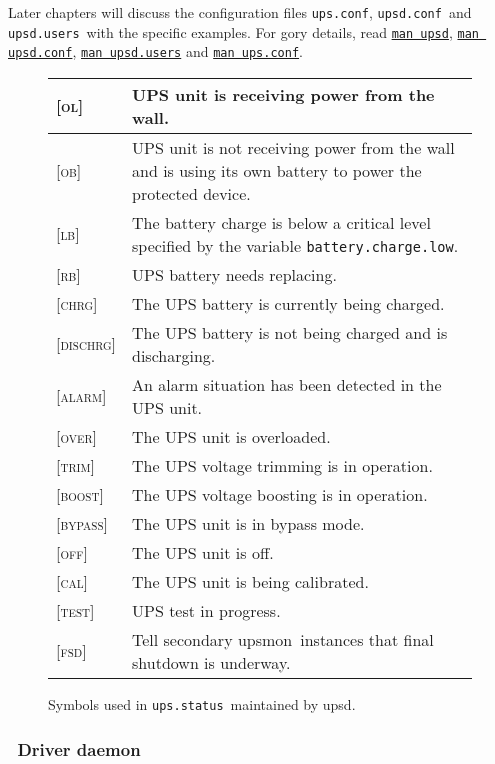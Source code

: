 \documentclass[12pt]{article}
\newlength{\headersep}\setlength{\headersep}{3mm}
\newcommand{\Hsep}{\hspace{\headersep}}
\newcommand{\newcolumn}{\vfill\eject}
\newcommand{\upsd}{\mbox{\textcolor{UPSDCOLOUR}{upsd}}}
\newcommand{\upsmon}{\mbox{\textcolor{MONCOLOUR}{upsmon}}}
\newcommand{\ALARM}{\textcolor{UPSDCOLOUR}{\textsc{alarm}}}
\newcommand{\BOOST}{\textcolor{UPSDCOLOUR}{\textsc{boost}}}
\newcommand{\BYPASS}{\textcolor{UPSDCOLOUR}{\textsc{bypass}}}
\newcommand{\CAL}{\textcolor{UPSDCOLOUR}{\textsc{cal}}}
\newcommand{\CHRG}{\textcolor{UPSDCOLOUR}{\textsc{chrg}}}
\newcommand{\DISCHRG}{\textcolor{UPSDCOLOUR}{\textsc{dischrg}}}
\newcommand{\FSDst}{\textcolor{UPSDCOLOUR}{\textsc{fsd}}}
\newcommand{\LB}{\textcolor{UPSDCOLOUR}{\textsc{lb}}}
\newcommand{\OB}{\textcolor{UPSDCOLOUR}{\textsc{ob}}}
\newcommand{\OFF}{\textcolor{UPSDCOLOUR}{\textsc{off}}}
\newcommand{\OL}{\textcolor{UPSDCOLOUR}{\textsc{ol}}}
\newcommand{\OVER}{\textcolor{UPSDCOLOUR}{\textsc{over}}}
\newcommand{\RB}{\textcolor{UPSDCOLOUR}{\textsc{rb}}}
\newcommand{\TEST}{\textcolor{UPSDCOLOUR}{\textsc{test}}}
\newcommand{\TRIM}{\textcolor{UPSDCOLOUR}{\textsc{trim}}}
\newcommand{\status}[1]{\textcolor{UPSDCOLOUR}{[{#1}]}}
\newcommand{\upsconf}{\textcolor{UPSDCOLOUR}{\texttt{ups.conf}}}
\newcommand{\upsdconf}{\textcolor{UPSDCOLOUR}{\texttt{upsd.conf}}}
\newcommand{\upsdusers}{\textcolor{UPSDCOLOUR}{\texttt{upsd.users}}}
\newcommand{\batterychargelow}{\textcolor{UPSDCOLOUR}{\texttt{battery{\allowbreak}.charge{\allowbreak}.low}}}
\newcommand{\upsstatus}{\textcolor{UPSDCOLOUR}{\texttt{ups{\allowbreak}.status}}}
\newcommand{\NUTman}[1]{\href{https://networkupstools.org/docs/man/#1.html}{\texttt{man #1}}}
\begin{document}
Later chapters will discuss the configuration files \upsconf, \upsdconf\ and
\upsdusers\ with the specific examples. For gory details, read \NUTman{upsd},
\NUTman{upsd.conf}, \NUTman{upsd.users} and \NUTman{ups.conf}.

\begin{figure}[htb]
\begin{center}
\begin{tabular}{|l|p{0.7\LinePrinterwidth}|}
\hline
\status{\OL}      & UPS unit is receiving power from the wall.  \\ \hline
\status{\OB}      & UPS unit is not receiving power from the wall and is using its
                    own battery to power the protected device. \\ \hline
\status{\LB}      & The battery charge is below a critical level specified by the 
                    variable \batterychargelow. \\ \hline
\status{\RB}      & UPS battery needs replacing.  \\ \hline
\status{\CHRG}    & The UPS battery is currently being charged. \\ \hline
\status{\DISCHRG} & The UPS battery is not being charged and is discharging.  \\ \hline
\status{\ALARM}   & An alarm situation has been detected in the UPS unit. \\ \hline
\status{\OVER}    & The UPS unit is overloaded. \\ \hline
\status{\TRIM}    & The UPS voltage trimming is in operation. \\ \hline
\status{\BOOST}   & The UPS voltage boosting is in operation. \\ \hline
\status{\BYPASS}  & The UPS unit is in bypass mode. \\ \hline
\status{\OFF}     & The UPS unit is off. \\ \hline
\status{\CAL}     & The UPS unit is being calibrated. \\ \hline
\status{\TEST}    & UPS test in progress. \\ \hline
\status{\FSDst}   & Tell secondary \upsmon\ instances that final shutdown is underway. \\ \hline
\end{tabular}
\caption{Symbols used in \upsstatus\ maintained by \upsd.\label{fig:statussymbols}}
\end{center}
\end{figure}

\newcolumn
\subsubsection{\Hsep\ Driver daemon}\label{section:driver}
\end{document}
